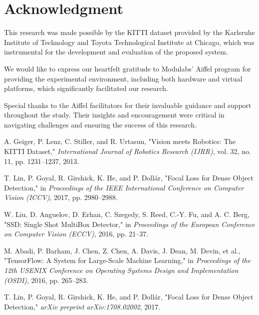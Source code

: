 \documentclass[10pt,twocolumn,letterpaper]{article}
\begin{document}
\section*{Acknowledgment}

This research was made possible by the KITTI dataset provided by the Karlsruhe Institute of Technology and Toyota Technological Institute at Chicago, which was instrumental for the development and evaluation of the proposed system. 

We would like to express our heartfelt gratitude to Modulabs' Aiffel program for providing the experimental environment, including both hardware and virtual platforms, which significantly facilitated our research. 

Special thanks to the Aiffel facilitators for their invaluable guidance and support throughout the study. Their insights and encouragement were critical in navigating challenges and ensuring the success of this research.

\begin{thebibliography}{99}

A. Geiger, P. Lenz, C. Stiller, and R. Urtasun, 
"Vision meets Robotics: The KITTI Dataset," 
\textit{International Journal of Robotics Research (IJRR)}, vol. 32, no. 11, pp. 1231–1237, 2013. 

T. Lin, P. Goyal, R. Girshick, K. He, and P. Dollár,
"Focal Loss for Dense Object Detection,"
in \textit{Proceedings of the IEEE International Conference on Computer Vision (ICCV)}, 2017, pp. 2980–2988.

W. Liu, D. Anguelov, D. Erhan, C. Szegedy, S. Reed, C.-Y. Fu, and A. C. Berg,
"SSD: Single Shot MultiBox Detector,"
in \textit{Proceedings of the European Conference on Computer Vision (ECCV)}, 2016, pp. 21–37.

M. Abadi, P. Barham, J. Chen, Z. Chen, A. Davis, J. Dean, M. Devin, et al.,
"TensorFlow: A System for Large-Scale Machine Learning,"
in \textit{Proceedings of the 12th USENIX Conference on Operating Systems Design and Implementation (OSDI)}, 2016, pp. 265–283.

T. Lin, P. Goyal, R. Girshick, K. He, and P. Dollár,
"Focal Loss for Dense Object Detection,"
\textit{arXiv preprint arXiv:1708.02002}, 2017.

\end{thebibliography}
\end{document}
